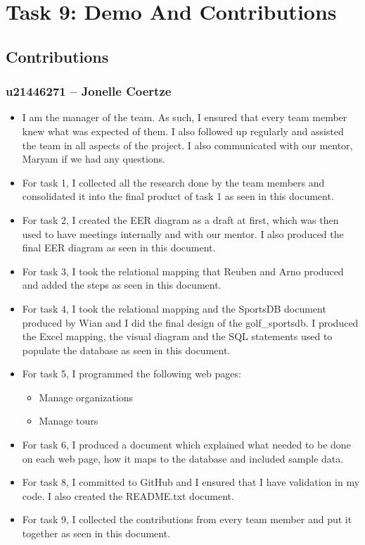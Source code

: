 \documentclass[titlepage]{article}
\begin{document}
\newpage


\section{Task 9: Demo And Contributions}
\vspace{1em}
\subsection{Contributions}
\vspace{1em}
\subsubsection*{u21446271 – Jonelle Coertze}
\vspace{1em}
\begin{itemize}
  \item I am the manager of the team. As such, I ensured that every team member knew what was expected of them. I also 
        followed up regularly and assisted the team in all aspects of the project. I also communicated with our mentor,
        Maryam if we had any questions.
  \item For task 1, I collected all the research done by the team members and consolidated it into the final product
        of task 1 as seen in this document.
  \item For task 2, I created the EER diagram as a draft at first, which was then used to have meetings internally
        and with our mentor. I also produced the final EER diagram as seen in this document.
  \item For task 3, I took the relational mapping that Reuben and Arno produced and added the steps as seen in this document.
  \item For task 4, I took the relational mapping and the SportsDB document produced by Wian and I did the final design of
        the golf\_sportsdb. I produced the Excel mapping, the visual diagram and the SQL statements used to populate the
        database as seen in this document.
  \item For task 5, I programmed the following web pages:
  \begin{itemize}
    \item Manage organizations
    \item Manage tours 
  \end{itemize}
  \item For task 6, I produced a document which explained what needed to be done on each web page, how it maps to the
        database and included sample data.
  \item For task 8, I committed to GitHub and I ensured that I have validation in my code. I also created the README.txt document.
  \item For task 9, I collected the contributions from every team member and put it together as seen in this document.
\end{itemize}
\end{document}
